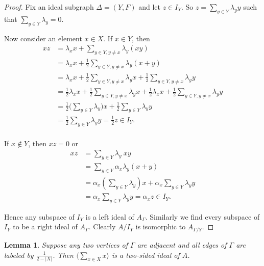 \documentclass[oneside,a4paper]{amsart} %
\newtheorem{lemma}[proposition]{Lemma}
\theoremstyle{definition}
\begin{document}
\begin{proof}
Fix an ideal subgraph $\Delta=(Y,F)$ and let $z\in I_Y$. So 
$z=\displaystyle\sum_{y\in Y} \lambda_y y$ such that $\displaystyle\sum_{y\in Y} \lambda_y=0$.

Now consider an element  $x\in X$. 
If $x\in Y$,  then
$$\begin{array}{ll}
xz
&=\lambda_x x+{\displaystyle\sum_{y\in Y,y\neq x}}\lambda_y (xy)\\
&=\lambda_x x+\frac{1}{2} \displaystyle\sum_{y\in Y, y\neq x}\lambda_y (x+y)\\
&=\lambda_x x+\frac{1}{2} {\displaystyle\sum_{y\in Y, y\neq x}\lambda_y x}+\frac{1}{2} \displaystyle\sum_{y\in Y, y\neq x}\lambda_y y\\
&=\frac{1}{2}\lambda_x x+\frac{1}{2} {\displaystyle\sum_{y\in Y, y\neq x}\lambda_y x}+\frac{1}{2}\lambda_x x+\frac{1}{2} \displaystyle\sum_{y\in Y, y\neq x}\lambda_y y\\
&=\frac{1}{2} ({\displaystyle\sum_{y\in Y}\lambda_y) x}+\frac{1}{2} \displaystyle\sum_{y\in Y}\lambda_y y\\
&=\frac{1}{2} \displaystyle\sum_{y\in Y}\lambda_y y=\frac{1}{2}z\in I_Y.\\
\end{array}$$

If $x\not \in Y$, then $xz=0$ or
$$\begin{array}{ll}
xz
&=\displaystyle\sum_{y\in Y} \lambda_y \ xy\\
&=\displaystyle\sum_{y\in Y}\alpha_{x} \lambda_y (x+y)\\
&=\alpha_x(\displaystyle\sum_{y\in Y}\lambda_y)x+ \alpha_x \displaystyle\sum_{y\in Y}\lambda_y y\\
&= \alpha_x  \displaystyle\sum_{y\in Y}\lambda_y y =\alpha_x z\in I_Y.
\end{array}$$

Hence any subspace of  $I_Y$ is a left ideal of $A_\Gamma$.
Similarly we find every subspace of $I_Y$ to be a right ideal of $A_\Gamma$.
Clearly $A/I_Y$ is isomorphic to $A_{\Gamma/Y}$.
\end{proof}




\begin{lemma}\label{ideal}
Suppose any two vertices of $\Gamma$ are adjacent and all edges of $\Gamma$ are labeled by $\frac{1}{2-|X|}$.
Then $\langle\displaystyle\sum_{x\in X} x\rangle$ is a two-sided ideal of $A$. 
\end{lemma}
\end{document}
